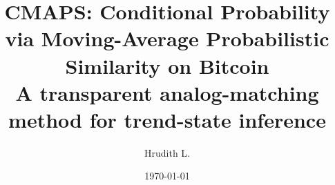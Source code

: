 \documentclass[11pt]{article}
\title{%
  \textbf{CMAPS: Conditional Probability via Moving-Average Probabilistic Similarity on Bitcoin}\\[0.4em]
  \large A transparent analog-matching method for trend-state inference
}
\author{Hrudith L.}
\date{\today}
\begin{document}
\maketitle








\begingroup
\small


\endgroup
\end{document}
